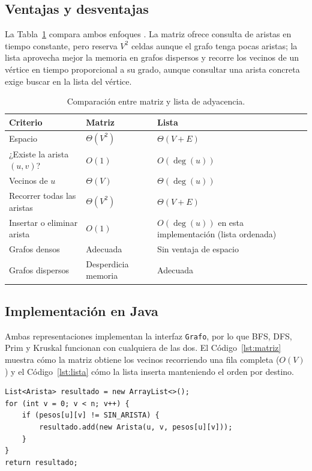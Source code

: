 \documentclass[conference]{IEEEtran}
\begin{document}
\subsection{Ventajas y desventajas}
La Tabla~\ref{tab:comparacion} compara ambos enfoques \cite{clrs,sedgewick}. La matriz ofrece consulta de aristas en tiempo constante, pero reserva $V^2$ celdas aunque el grafo tenga pocas aristas; la lista aprovecha mejor la memoria en grafos dispersos y recorre los vecinos de un vértice en tiempo proporcional a su grado, aunque consultar una arista concreta exige buscar en la lista del vértice.

\begin{table}[t]
\caption{Comparación entre matriz y lista de adyacencia.}
\label{tab:comparacion}
\centering
\footnotesize
\setlength{\tabcolsep}{3pt}
\begin{tabular}{@{}p{2.2cm}p{2.7cm}p{2.9cm}@{}}
\toprule
Criterio & Matriz & Lista \\
\midrule
Espacio & $\Theta(V^2)$ & $\Theta(V+E)$ \\
¿Existe la arista $(u,v)$? & $O(1)$ & $O(\deg(u))$ \\
Vecinos de $u$ & $\Theta(V)$ & $\Theta(\deg(u))$ \\
Recorrer todas las aristas & $\Theta(V^2)$ & $\Theta(V+E)$ \\
Insertar o eliminar arista & $O(1)$ & $O(\deg(u))$ en esta implementación (lista ordenada) \\
Grafos densos & Adecuada & Sin ventaja de espacio \\
Grafos dispersos & Desperdicia memoria & Adecuada \\
\bottomrule
\end{tabular}
\end{table}

\subsection{Implementación en Java}
Ambas representaciones implementan la interfaz \texttt{Grafo}, por lo que BFS, DFS, Prim y Kruskal funcionan con cualquiera de las dos. El Código~\ref{lst:matriz} muestra cómo la matriz obtiene los vecinos recorriendo una fila completa ($O(V)$) y el Código~\ref{lst:lista} cómo la lista inserta manteniendo el orden por destino.

\noindent\begin{minipage}{\columnwidth}
\begin{lstlisting}[caption={Matriz: vecinos de un vértice, $O(V)$ (\texttt{GrafoMatriz}).},label={lst:matriz}]
List<Arista> resultado = new ArrayList<>();
for (int v = 0; v < n; v++) {
    if (pesos[u][v] != SIN_ARISTA) {
        resultado.add(new Arista(u, v, pesos[u][v]));
    }
}
return resultado;
\end{lstlisting}
\end{minipage}\par\medskip
\end{document}
